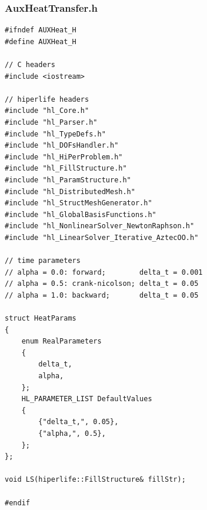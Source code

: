 \documentclass[]{article}
\begin{document}
\subsubsection{AuxHeatTransfer.h} \label{sec: a.h}
\begin{lstlisting}
#ifndef AUXHeat_H
#define AUXHeat_H
	
// C headers
#include <iostream>
	
// hiperlife headers
#include "hl_Core.h"
#include "hl_Parser.h"
#include "hl_TypeDefs.h"  
#include "hl_DOFsHandler.h"
#include "hl_HiPerProblem.h"
#include "hl_FillStructure.h"
#include "hl_ParamStructure.h"
#include "hl_DistributedMesh.h" 
#include "hl_StructMeshGenerator.h" 
#include "hl_GlobalBasisFunctions.h"
#include "hl_NonlinearSolver_NewtonRaphson.h"
#include "hl_LinearSolver_Iterative_AztecOO.h"
	
// time parameters
// alpha = 0.0: forward;        delta_t = 0.001
// alpha = 0.5: crank-nicolson; delta_t = 0.05
// alpha = 1.0: backward;       delta_t = 0.05
	
struct HeatParams
{
	enum RealParameters
	{
		delta_t,
		alpha,
	};
	HL_PARAMETER_LIST DefaultValues
	{
		{"delta_t,", 0.05},
		{"alpha,", 0.5},
	};
};
	
void LS(hiperlife::FillStructure& fillStr);
	
#endif
\end{lstlisting}
\end{document}
